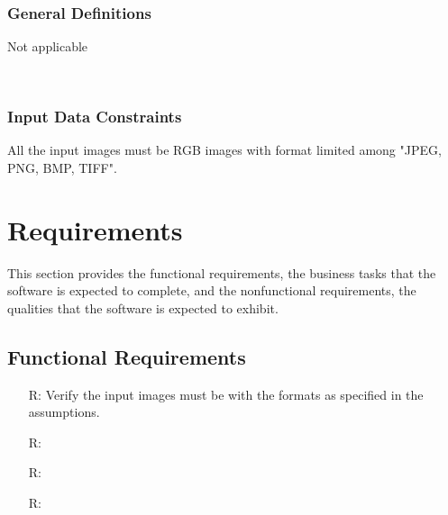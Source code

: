 \documentclass[12pt]{article}
\newcounter{reqnum} %
\begin{document}
~\newline

\subsubsection{General Definitions}\label{sec_gendef}

Not applicable

~\newline



\subsubsection{Input Data Constraints} \label{sec_DataConstraints}    

All the input images must be RGB images with format limited among "JPEG, PNG, BMP, TIFF". 

\section{Requirements}


This section provides the functional requirements, the business tasks that the
software is expected to complete, and the nonfunctional requirements, the
qualities that the software is expected to exhibit.

\subsection{Functional Requirements}

\noindent \begin{itemize}

\item[R\refstepcounter{reqnum}\thereqnum \label{R_OutputInputs}:] Verify the input images must be with the formats as specified in the assumptions.

\item[R\refstepcounter{reqnum}\thereqnum \label{R_Calculate}:] 

\item[R\refstepcounter{reqnum}\thereqnum \label{R_VerifyOutput}:]

\item[R\refstepcounter{reqnum}\thereqnum \label{R_Output}:] 

\end{itemize}
\end{document}
